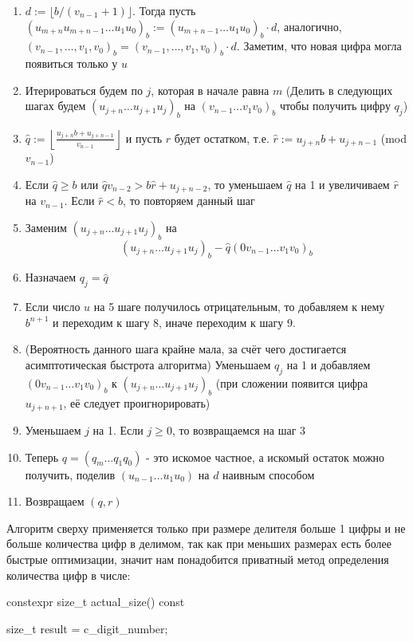 \begin{itemize}
   \begin{enumerate}
     \item $d:=\lfloor b/(v_{n-1}+1)\rfloor$. Тогда пусть $(u_{m+n}u_{m+n-1}\dots u_1u_0)_b:=(u_{m+n-1}\dots u_1u_0)_b\cdot d$, аналогично, $(v_{n-1},\dots,v_1,v_0)_b =(v_{n-1},\dots,v_1,v_0)_b\cdot d$. Заметим, что новая цифра могла появиться только у $u$
     \item Итерироваться будем по $j$, которая в начале равна $m$ (Делить в следующих шагах будем $(u_{j+n}\dots u_{j+1}u_j)_b$ на $(v_{n-1}\dots v_1v_0)_b$ чтобы получить цифру $q_j$) 
     \item $\hat{q} := \left\lfloor \frac{u_{j+n}b + u_{j+n-1}}{v_{n-1}}\right\rfloor$ и пусть $\hat{r}$ будет остатком, т.е. $\hat{r} :=u_{j+n}b + u_{j+n-1}$ (mod $v_{n-1}$)
     \item Если $\hat{q}\geqslant b$ или $\hat{q}v_{n-2}>b\hat{r} + u_{j+n-2}$, то уменьшаем $\hat{q}$ на 1 и увеличиваем $\hat{r}$ на $v_{n-1}$. Если $\hat{r}<b$, то повторяем данный шаг
     \item Заменим $(u_{j+n}\dots u_{j+1}u_j)_b$ на
     \[(u_{j+n}\dots u_{j+1}u_j)_b - \hat{q}(0v_{n-1}\dots v_1v_0)_b\]
     \item Назначаем $q_j = \hat{q}$
     \item Если число $u$ на 5 шаге получилось отрицательным, то добавляем к нему $b^{n+1}$ и переходим к шагу 8, иначе переходим к шагу 9.
     \item (Вероятность данного шага крайне мала, за счёт чего достигается асимптотическая быстрота алгоритма) Уменьшаем $q_j$ на 1 и добавляем $(0v_{n-1}\dots v_1v_0)_b$ к $(u_{j+n}\dots u_{j+1}u_j)_b$ (при сложении появится цифра $u_{j+n+1}$, её следует проигнорировать)
     \item Уменьшаем $j$ на 1. Если $j\geqslant 0$, то возвращаемся на шаг 3
     \item Теперь $q=(q_m\dots q_1q_0)$ - это искомое частное, а искомый остаток можно получить, поделив $(u_{n-1}\dots u_1u_0)$ на $d$ наивным способом 
     \item Возвращаем $(q,r)$
   \end{enumerate}
   Алгоритм сверху применяется только при размере делителя больше 1 цифры и не больше количества цифр в делимом, так как при меньших размерах есть более быстрые оптимизации, значит нам понадобится приватный метод определения количества цифр в числе:
   \begin{cppcode}
constexpr size_t actual_size() const {
    size_t result = c_digit_number;

}
\end{cppcode}
\end{itemize}
